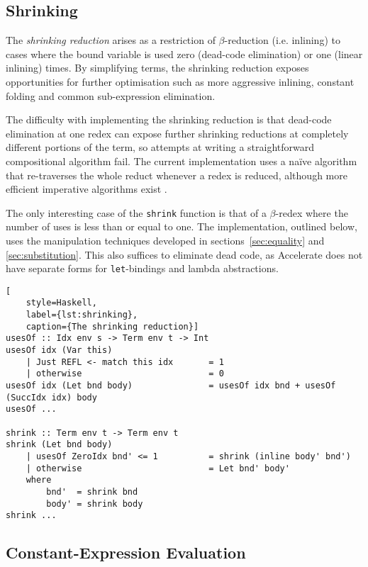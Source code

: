 \subsection{Shrinking}

The \emph{shrinking reduction} arises as a restriction of $\beta$-reduction
(i.e. inlining) to cases where the bound variable is used zero (dead-code
elimination) or one (linear inlining) times. By simplifying terms,
the shrinking reduction exposes opportunities for further optimisation such as
more aggressive inlining, constant folding and common sub-expression
elimination. %

The difficulty with implementing the shrinking reduction is that dead-code
elimination at one redex can expose further shrinking reductions at completely
different portions of the term, so attempts at writing a straightforward
compositional algorithm fail. The current implementation uses a na\"ive
algorithm that re-traverses the whole reduct whenever a redex is reduced,
although more efficient imperative algorithms exist
\cite{Appel:1997gs,Benton:2004ua,Kennedy:2007cb}.

The only interesting case of the \texttt{shrink} function is that of a
$\beta$-redex where the number of uses is less than or equal to one. The
implementation, outlined below, uses the  manipulation
techniques developed in sections~\ref{sec:equality} and \ref{sec:substitution}.
This also suffices to eliminate dead code, as Accelerate does not have separate
forms for \texttt{let}-bindings and lambda abstractions.
%
\begin{lstlisting}[
    style=Haskell,
    label={lst:shrinking},
    caption={The shrinking reduction}]
usesOf :: Idx env s -> Term env t -> Int
usesOf idx (Var this)
    | Just REFL <- match this idx       = 1
    | otherwise                         = 0
usesOf idx (Let bnd body)               = usesOf idx bnd + usesOf (SuccIdx idx) body
usesOf ...

shrink :: Term env t -> Term env t
shrink (Let bnd body)
    | usesOf ZeroIdx bnd' <= 1          = shrink (inline body' bnd')
    | otherwise                         = Let bnd' body'
    where
        bnd'  = shrink bnd
        body' = shrink body
shrink ...
\end{lstlisting}


\subsection{Constant-Expression Evaluation}

